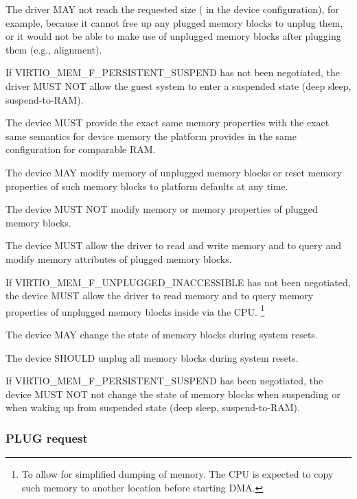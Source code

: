 The driver MAY not reach the requested size ( in the
device configuration), for example, because it cannot free up any plugged
memory blocks to unplug them, or it would not be able to make use of
unplugged memory blocks after plugging them (e.g., alignment).

If VIRTIO_MEM_F_PERSISTENT_SUSPEND has not been negotiated, the driver MUST NOT
allow the guest system to enter a suspended state (deep sleep, suspend-to-RAM).


The device MUST provide the exact same memory properties with the exact same
semantics for device memory the platform provides in the same configuration for
comparable RAM.

The device MAY modify memory of unplugged memory blocks or reset memory
properties of such memory blocks to platform defaults at any time.

The device MUST NOT modify memory or memory properties of plugged memory
blocks.

The device MUST allow the driver to read and write memory and to query
and modify memory attributes of plugged memory blocks.

If VIRTIO_MEM_F_UNPLUGGED_INACCESSIBLE has not been negotiated, the device
MUST allow the driver to read memory and to query memory properties of
unplugged memory blocks inside  via the CPU.
\footnote{To allow for simplified dumping of memory. The CPU is expected to
copy such memory to another location before starting DMA.}

The device MAY change the state of memory blocks during system resets.

The device SHOULD unplug all memory blocks during system resets.

If VIRTIO_MEM_F_PERSISTENT_SUSPEND has been negotiated, the device MUST NOT not
change the state of memory blocks when suspending or when waking up from
suspended state (deep sleep, suspend-to-RAM).

\subsubsection{PLUG request}\label{sec:Device Types / Memory Device / Device Operation / PLUG request}

